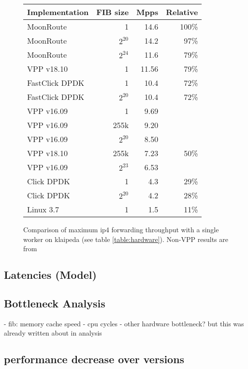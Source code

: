 \begin{figure}[!ht]
	\vspace{5ex}
	\begin{tabular}[]{ l r r r }
		Implementation & FIB size & Mpps & Relative \\ 
		\midrule
		MoonRoute & 1 & 14.6 & 100\% \\
		MoonRoute & $2^{20}$ & 14.2 & 97\% \\
		MoonRoute & $2^{24}$ & 11.6 & 79\% \\
		VPP v18.10 & 1 & 11.56 & 79\% \\
		FastClick DPDK & 1 & 10.4 & 72\% \\
		FastClick DPDK & $2^{20}$ & 10.4 & 72\% \\
		VPP v16.09 & 1 & 9.69 & \\
		VPP v16.09 & 255k & 9.20 & \\
		VPP v16.09 & $2^{20}$ & 8.50 & \\
		VPP v18.10 & 255k & 7.23 & 50\% \\
		VPP v16.09 & $2^{23}$ & 6.53 & \\
		Click DPDK & 1 & 4.3 & 29\% \\
		Click DPDK & $2^{20}$ & 4.2 & 28\% \\
		Linux 3.7 & 1 & 1.5 & 11\% \\

		\midrule
	\end{tabular}
	\caption{Comparison of maximum \Ac{ip4} forwarding throughput with a single worker on klaipeda (see table \ref{table:hardware}). Non-VPP results are from \cite{chair:architecture}}
	\label{table:comparison}
\end{figure}




\subsection{Latencies (Model)}




\subsection{Bottleneck Analysis}

- fib: memory cache speed
- cpu cycles
- other hardware bottleneck? but this was already written about in analysis

\subsection{performance decrease over versions}